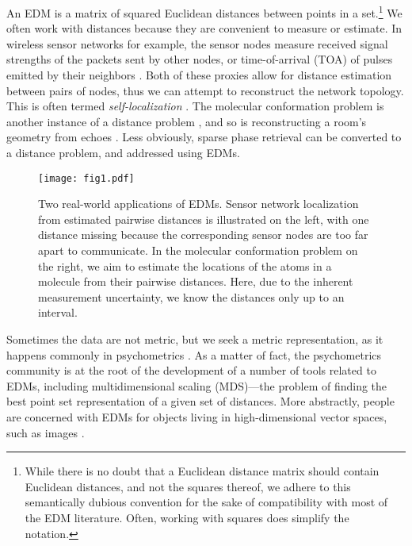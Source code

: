 \documentclass[10pt,double]{IEEEtran}
\newcommand{\rev}[1]{{#1}}
\begin{document}
An EDM is a matrix of squared Euclidean distances between points in a
set.\footnote{\rev{While there is no doubt that a Euclidean distance matrix
should contain Euclidean distances, and not the squares thereof, we adhere to
this semantically dubious convention for the sake of compatibility with most
of the EDM literature. Often, working with squares does simplify the
notation.}} We often work with distances because they are convenient to
measure or estimate. In wireless sensor networks for example, the sensor nodes
measure
\rev{received signal strengths} of the packets sent by other nodes, or time-of-arrival (TOA) of pulses emitted by their neighbors \cite{Patwari:2005kc}.
Both of these proxies allow for distance estimation between pairs of nodes,
thus we can attempt to reconstruct the network topology. This is often termed
\emph{self-localization}
\cite{Alfakih1999,dohetry2001,Biswas2004}. The molecular conformation problem
is another instance of a distance problem \cite{Havel1985281},
and so is reconstructing a room's geometry from echoes
\cite{Dokmanic:2013dz}. Less
obviously, sparse phase retrieval \cite{Ranieri:2013tx} can be converted to a
distance problem, and addressed using EDMs.

\begin{figure}
\centering
\texttt{[image: fig1.pdf]}
\caption{Two real-world applications of EDMs. Sensor network localization
from estimated pairwise distances is illustrated on the left, with one
distance missing because the corresponding sensor nodes are too far apart to
communicate. In the molecular conformation problem on the right, we aim to
estimate the locations of the atoms in a molecule from their pairwise
distances. Here, due to the inherent measurement uncertainty, we know the
distances only up to an interval.}
  \vspace{-2mm}
\label{fig:intro}
\end{figure}

Sometimes the data are not metric, but we seek a
metric representation, as it happens commonly in psychometrics
\cite{torgerson1952}. As a matter of fact, the psychometrics community is
at the root of the development of a number of tools related to EDMs, including
multidimensional scaling (MDS)---the problem of finding the best point set
representation of a given set of distances. More abstractly, people are
concerned with EDMs for objects living in high-dimensional vector spaces, such
as images \cite{Weinberger2004}.
\end{document}
